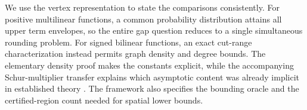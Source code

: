 \documentclass[11pt]{article}
\begin{document}
We use the vertex representation to state the comparisons consistently.
For positive multilinear functions, a common probability distribution
attains all upper term envelopes, so the entire gap question reduces to a
single simultaneous rounding problem. For signed bilinear functions, an
exact cut-range characterization instead permits graph density and degree
bounds. The elementary density proof makes the constants explicit, while
the accompanying Schur-multiplier transfer explains which asymptotic content
was already implicit in established theory \citep{DavidsonDonsig2007}.
The framework also specifies the bounding oracle and the certified-region
count needed for spatial lower bounds.




\end{document}
